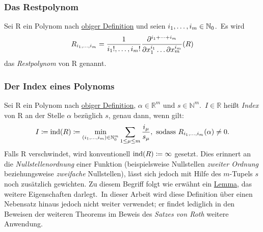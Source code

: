     \subsubsection{Das Restpolynom}
        \label{subsubsec:def-remainder-poly}
        Sei R ein Polynom nach \hyperref[subsubsec:def-poly]{obiger Definition} und seien $i_1, \dots, i_m \in \mathbb
        {N}_0$.\ Es wird
        \begin{equation}
            R_{i_1, \dots, i_m} = \frac{1}{i_1!, \dots, i_m!} \frac{\partial^{i_1 + \dots + i_m}}{
                \partial x_1^{i_1} \dots \partial x_m^{i_m}} (R) \label{eq:def-rempoly}
        \end{equation}
        das \emph{Restpolynom} von R genannt.
    
    \subsubsection{Der Index eines Polynoms}
        \label{subsubsec:def-index}
        \textrm{Sei R ein Polynom nach \hyperref[subsubsec:def-poly]{obiger Definition}, $\alpha \in \mathbb{R}^m$ und
            $s \in \mathbb{N}^m$.\ $I \in \mathbb{R}$ heißt \emph{Index} von R an der Stelle $\alpha$ bezüglich $s$,
            genau dann, wenn gilt:}
        \begin{equation}
            I \coloneq \operatorname{ind}(R) \coloneq \min_{(i_1, \dots, i_m) \in \mathbb{N}_0^m} \sum_{1 \leq \mu \leq m} \frac{i_\mu}
            {s_\mu}, \ \textrm{sodass}\  R_{i_1, \dots, i_m}(\alpha) \neq 0. \label{eq:def-index}
        \end{equation}
        Falls R verschwindet, wird konventionell $\operatorname{ind}(R) \coloneq \infty$ gesetzt.
        \newline
        \textrm{Dies erinnert an die \emph{Nullstellenordnung} einer Funktion (beispielsweise Nullstellen \emph
        {zweiter Ordnung} beziehungsweise \emph{zweifache} Nullstellen), lässt sich jedoch mit Hilfe des $m$-Tupels $s$
        noch zusätzlich gewichten.
        \newline
        Zu diesem Begriff folgt wie erwähnt ein \hyperref[subsec:lemma2]{Lemma}, das weitere Eigenschaften darlegt.\ In
        dieser Arbeit wird diese Definition über einen Nebensatz hinaus jedoch nicht weiter verwendet; er findet lediglich
            in den Beweisen der weiteren Theorems im Beweis des \emph{Satzes von Roth} weitere Anwendung.}
    
